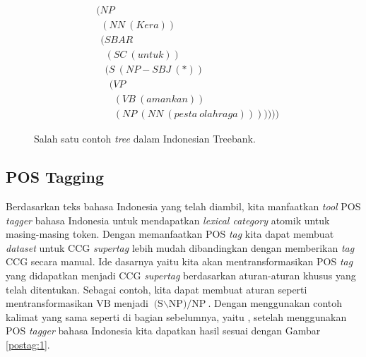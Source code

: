 \begin{figure}\centering\small
	\begin{align*}
		&(NP\\
		&\ \ (NN\ (Kera))\\
		&\ \ (SBAR\\
		&\ \ \ \ (SC\ (untuk))\\
		&\ \ \ \ (S\ (NP-SBJ\ (*))\\
		&\ \ \ \ \ \ (VP\\
		&\ \ \ \ \ \ \ \ (VB\ (amankan))\\
		&\ \ \ \ \ \ \ \ (NP\ (NN\ (pesta\ olahraga)))))))
	\end{align*}
	\caption{Salah satu contoh \textit{tree} dalam Indonesian Treebank.}
	\label{treebank:tree:1}
\end{figure}


\subsection{POS Tagging}

Berdasarkan teks bahasa Indonesia yang telah diambil, kita manfaatkan \textit{tool} POS \textit{tagger}
bahasa Indonesia untuk mendapatkan \textit{lexical category} atomik untuk masing-masing token.
Dengan memanfaatkan POS \textit{tag} kita dapat membuat \textit{dataset} untuk CCG \textit{supertag}
lebih mudah dibandingkan dengan memberikan \textit{tag} CCG secara manual.
Ide dasarnya yaitu kita akan mentransformasikan POS \textit{tag} yang didapatkan menjadi CCG
\textit{supertag} berdasarkan aturan-aturan khusus yang telah ditentukan.
Sebagai contoh, kita dapat membuat aturan seperti mentransformasikan $\text{VB}$ menjadi
$\text{(S$\backslash$NP)/NP}$.
Dengan menggunakan contoh kalimat yang sama seperti di bagian sebelumnya,
yaitu , setelah menggunakan POS \textit{tagger} bahasa
Indonesia kita dapatkan hasil sesuai dengan Gambar \ref{postag:1}.


